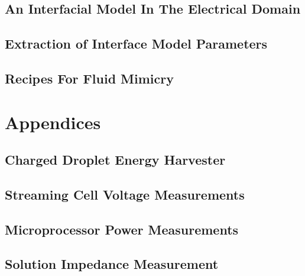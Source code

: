   \chapter{An Interfacial Model In The Electrical Domain}
    \label{chap:theInterfaceModel}
    

  \chapter{Extraction of Interface Model Parameters}
    \label{chap:modellingSaline}
    

  \chapter{Recipes For Fluid Mimicry}
    \label{chap:fluid_mimicry}
    

\part{Appendices}

  \appendix

  \chapter{Charged Droplet Energy Harvester}
    \label{appendix:chargedDropletts}
    

  \chapter{Streaming Cell Voltage Measurements}
    \label{appendix:streamingCellMeasurements}
    

  \chapter{Microprocessor Power Measurements}
    

  \chapter{Solution Impedance Measurement}
    


